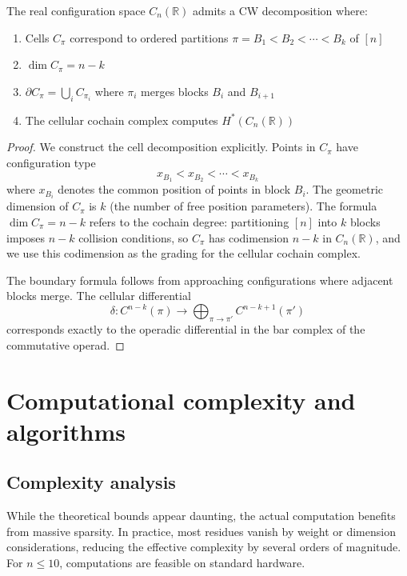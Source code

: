 \begin{theorem}
\label{thm:permutohedral-cell-complex}
The real configuration space $C_n(\mathbb{R})$ admits a CW decomposition where:
\begin{enumerate}
\item Cells $C_\pi$ correspond to ordered partitions $\pi = B_1 < B_2 < \cdots < B_k$ of $[n]$
\item $\dim C_\pi = n - k$
\item $\partial C_\pi = \bigcup_{i} C_{\pi_i}$ where $\pi_i$ merges blocks $B_i$ and $B_{i+1}$
\item The cellular cochain complex computes $H^*(C_n(\mathbb{R}))$
\end{enumerate}
\end{theorem} 
\begin{proof}
We construct the cell decomposition explicitly. Points in $C_\pi$ have configuration type
\[
x_{B_1} < x_{B_2} < \cdots < x_{B_k}
\]
where $x_{B_i}$ denotes the common position of points in block $B_i$.  The geometric dimension of $C_\pi$ is $k$ (the number of free position parameters).  The formula $\dim C_\pi = n - k$ refers to the cochain degree: partitioning $[n]$ into $k$ blocks imposes $n - k$ collision conditions, so $C_\pi$ has codimension $n - k$ in $C_n(\mathbb{R})$, and we use this codimension as the grading for the cellular cochain complex.
 
The boundary formula follows from approaching configurations where adjacent blocks merge. The cellular differential
\[
\delta: C^{n-k}(\pi) \to \bigoplus_{\pi \to \pi'} C^{n-k+1}(\pi')
\]
corresponds exactly to the operadic differential in the bar complex of the commutative operad.
\end{proof}
 
\section{Computational complexity and algorithms}
 
\subsection{Complexity analysis}

\begin{remark}[Implementation]
While the theoretical bounds appear daunting,
the actual computation benefits from massive sparsity. In practice, most residues vanish
by weight or dimension considerations, reducing the effective complexity by several orders
of magnitude. For $n \leq 10$, computations are feasible on standard hardware.
\end{remark}

